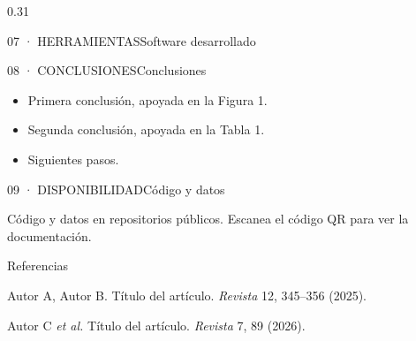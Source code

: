 \documentclass{article}
\begin{document}
\begin{ubcdcolumn}{0.31}
  \begin{ubcdblock}[ubcdpaper]{07 · HERRAMIENTAS}{Software desarrollado}
    \begin{ubcdrows}
    \end{ubcdrows}
  \end{ubcdblock}


  \begin{ubcdblock}{08 · CONCLUSIONES}{Conclusiones}
    \begin{itemize}
      \item Primera conclusión, apoyada en la Figura 1.
      \item Segunda conclusión, apoyada en la Tabla 1.
      \item Siguientes pasos.
    \end{itemize}
  \end{ubcdblock}

  \begin{ubcdblock}{09 · DISPONIBILIDAD}{Código y datos}
    \begin{minipage}[c]{0.62\linewidth}
      Código y datos en repositorios públicos. Escanea el código QR para ver la documentación.\par
      \vspace{12pt}{\ttfamily\small github.com/org/repo\par}
    \end{minipage}\hfill
    \begin{minipage}[c]{0.32\linewidth}\raggedleft
    \end{minipage}
  \end{ubcdblock}

  \begin{ubcdblock}[ubcdplain]{}{Referencias}
    \begin{ubcdrefs}
      \item Autor A, Autor B. Título del artículo. \emph{Revista} 12, 345–356 (2025).
      \item Autor C \emph{et al.} Título del artículo. \emph{Revista} 7, 89 (2026).
    \end{ubcdrefs}
  \end{ubcdblock}
\end{ubcdcolumn}
\end{document}
